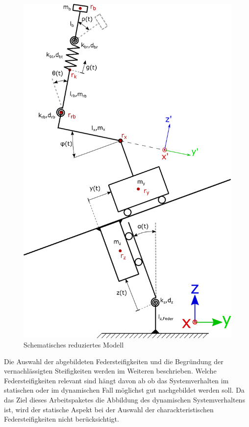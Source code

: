 \documentclass[10pt,a4paper]{iace.report}
\begin{document}
				\begin{figure}[h!]
					\centering
					\includegraphics[width=0.78\linewidth]{./pics/SchematischesModell.eps}
					\caption{Schematisches reduziertes Modell}
					\label{fig:scematic}
				\end{figure}
				Die Auswahl der abgebildeten Federsteifigkeiten und die Begründung der vernachlässigten Steifigkeiten werden im Weiteren beschrieben. Welche Federsteifigkeiten relevant sind hängt davon ab ob das Systemverhalten im statischen oder im dynamischen Fall möglichst gut nachgebildet werden soll. Da das Ziel dieses Arbeitspaketes die Abbildung des dynamischen Systemverhaltens ist, wird der statische Aspekt bei der Auswahl der charackteristischen Federsteifigkeiten nicht berücksichtigt.
\end{document}
